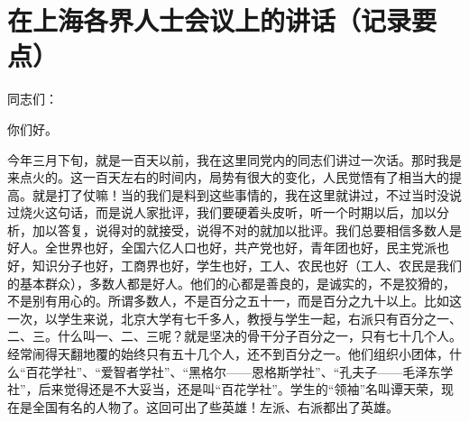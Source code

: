 \section[在上海各界人士会议上的讲话（记录要点）（一九五七年七月八日）]{在上海各界人士会议上的讲话（记录要点）}


同志们：

你们好。

今年三月下旬，就是一百天以前，我在这里同党内的同志们讲过一次话。那时我是来点火的。这一百天左右的时间内，局势有很大的变化，人民觉悟有了相当大的提高。就是打了仗嘛！当的我们是料到这些事情的，我在这里就讲过，不过当时没说过烧火这句话，而是说人家批评，我们要硬着头皮听，听一个时期以后，加以分析，加以答复，说得对的就接受，说得不对的就加以批评。我们总要相信多数人是好人。全世界也好，全国六亿人口也好，共产党也好，青年团也好，民主党派也好，知识分子也好，工商界也好，学生也好，工人、农民也好（工人、农民是我们的基本群众），多数人都是好人。他们的心都是善良的，是诚实的，不是狡猾的，不是别有用心的。所谓多数人，不是百分之五十一，而是百分之九十以上。比如这一次，以学生来说，北京大学有七千多人，教授与学生一起，右派只有百分之一、二、三。什么叫一、二、三呢？就是坚决的骨干分子百分之一，只有七十几个人。经常闹得天翻地覆的始终只有五十几个人，还不到百分之一。他们组织小团体，什么“百花学社”、“爱智者学社”、“黑格尔——恩格斯学社”、“孔夫子——毛泽东学社”，后来觉得还是不大妥当，还是叫“百花学社”。学生的“领袖”名叫谭天荣，现在是全国有名的人物了。这回可出了些英雄！左派、右派都出了英雄。

